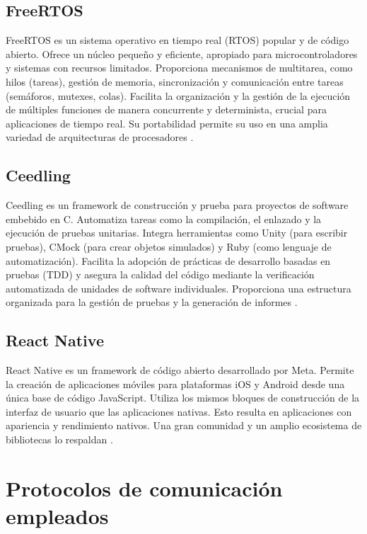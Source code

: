 \subsection{FreeRTOS}

FreeRTOS es un sistema operativo en tiempo real (RTOS) popular y de código abierto. Ofrece un núcleo pequeño y eficiente, apropiado para microcontroladores y sistemas con recursos limitados. Proporciona mecanismos de multitarea, como hilos (tareas), gestión de memoria, sincronización y comunicación entre tareas (semáforos, mutexes, colas). Facilita la organización y la gestión de la ejecución de múltiples funciones de manera concurrente y determinista, crucial para aplicaciones de tiempo real. Su portabilidad permite su uso en una amplia variedad de arquitecturas de procesadores \cite{FREERTOS}.

\subsection{Ceedling}

Ceedling es un framework de construcción y prueba para proyectos de software embebido en C. Automatiza tareas como la compilación, el enlazado y la ejecución de pruebas unitarias. Integra herramientas como Unity (para escribir pruebas), CMock (para crear objetos simulados) y Ruby (como lenguaje de automatización). Facilita la adopción de prácticas de desarrollo basadas en pruebas (TDD) y asegura la calidad del código mediante la verificación automatizada de unidades de software individuales. Proporciona una estructura organizada para la gestión de pruebas y la generación de informes \cite{CEEDLING}.

\subsection{React Native}
React Native es un framework de código abierto desarrollado por Meta. Permite la creación de aplicaciones móviles para plataformas iOS y Android desde una única base de código JavaScript. Utiliza los mismos bloques de construcción de la interfaz de usuario que las aplicaciones nativas. Esto resulta en aplicaciones con apariencia y rendimiento nativos. Una gran comunidad y un amplio ecosistema de bibliotecas lo respaldan \cite{reactnative}.

\section{Protocolos de comunicación empleados}

